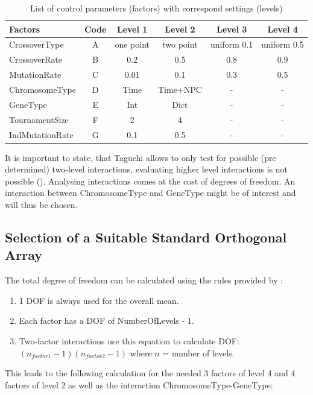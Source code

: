 \begin{table}[ht]
	\label{tab:hyperparameter_tuning:settings_to_level}
	\centering
\begin{tabular}{ l|c|cccc }
	\hline
	Factors & Code & Level 1 & Level 2 & Level 3 & Level 4\\
	\hline
	CrossoverType 		& A & one point & two point & uniform 0.1 & uniform 0.5\\
	CrossoverRate    	& B & 0.2 & 0.5 & 0.8 & 0.9\\
	MutationRate   		& C & 0.01 & 0.1 & 0.3 & 0.5\\
	ChromosomeType   	& D & Time & Time+NPC & - & -\\
	GeneType			& E & Int & Dict & - & -\\
	TournamentSize 		& F & 2 & 4 & - & -\\
	IndMutationRate		& G & 0.1 & 0.5 & - & -\\
	\hline
\end{tabular}
\caption{List of control parameters (factors) with correspond settings (levels)}
\end{table}

It is important to state, that Taguchi allows to only test for possible (pre determined) two-level interactions, evaluating higher level interactions is not possible (\cite{yang_design_2009}). Analysing interactions comes at the cost of degrees of freedom. An interaction between ChromosomeType and GeneType might be of interest and will thus be chosen.

\subsection{Selection of a Suitable Standard Orthogonal Array}
\label{sect:hyperparameter_tuning:selection_orthogonal_array}
The total degree of freedom can be calculated using the rules provided by \cite{yang_design_2009}:

\begin{enumerate}
	\item 1 DOF is always used for the overall mean. 
	\item Each factor has a DOF of NumberOfLevels - 1.
	\item Two-factor interactions use this equation to calculate DOF: $(n_{factor1} - 1)(n_{factor2} - 1)$ where $n$ = number of levels.
\end{enumerate}

This leads to the following calculation for the needed 3 factors of level 4 and 4 factors of level 2 as well as the interaction ChromosomeType-GeneType:

